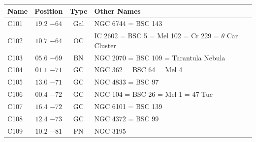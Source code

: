 \begin{table}[t]
    \setlength{\tabcolsep}{2pt}
    \footnotesize
    \begin{tabularx}{\linewidth}{lccX}
        \hline
        Name&Position&Type&Other Names\\
        \hline

C101 &$19.2$ $-64$&Gal&NGC 6744 = BSC 143\\
C102 &$10.7$ $-64$&OC &IC 2602 = BSC 5 = Mel 102 = Cr 229 = $\theta$ Car Cluster\\
C103 &$05.6$ $-69$&BN &NGC 2070 = BSC 109 = Tarantula Nebula\\
C104 &$01.1$ $-71$&GC &NGC 362 = BSC 64 = Mel 4\\
C105 &$13.0$ $-71$&GC &NGC 4833 = BSC 97\\
C106 &$00.4$ $-72$&GC &NGC 104 = BSC 26 = Mel 1 = 47 Tuc\\
C107 &$16.4$ $-72$&GC &NGC 6101 = BSC 139\\
C108 &$12.4$ $-73$&GC &NGC 4372 = BSC 99\\
C109 &$10.2$ $-81$&PN &NGC 3195\\

        \hline
    \end{tabularx}
\end{table}
\clearpage

